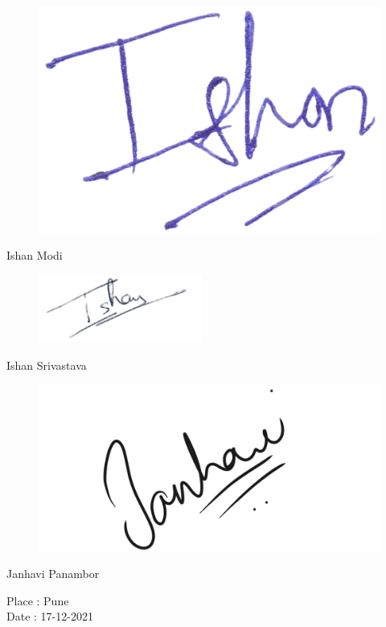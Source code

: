 \begin{raggedright}
\begin{figure}[H]
\begin{flushleft}
  \includegraphics[scale=0.14]{Ishan_m_sign.jpeg}
\end{flushleft}
\end{figure}
Ishan Modi\\
\begin{figure}[H]
\begin{flushleft}
  \includegraphics[scale=0.5]{Photos/Ishan_s_sign.jpeg}
\end{flushleft}
\end{figure}
Ishan Srivastava\\ 
\begin{figure}[H]
\begin{flushleft}
  \includegraphics[scale=0.1]{Photos/Janhavi_p_sign.jpeg}
\end{flushleft}
\end{figure}
Janhavi Panambor\\
\end{raggedright}


\noindent Place : Pune \\
Date : 17-12-2021



